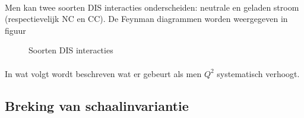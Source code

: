 \documentclass[a4paper,11pt]{article}
\numberwithin{equation}{section} %
\begin{document}
      \paragraph{}
Men kan twee soorten DIS interacties onderscheiden: neutrale en geladen stroom (respectievelijk NC en CC). De Feynman diagrammen worden weergegeven in figuur %
\begin{figure} [H]
  \centering
  \caption{Soorten DIS interacties}
  \label{fig:NC-CC}
\end{figure}

      \paragraph{}
In wat volgt wordt beschreven wat er gebeurt als men $Q^2$ systematisch verhoogt.

  \subsection{Breking van schaalinvariantie}
\end{document}
